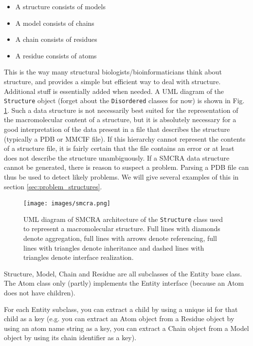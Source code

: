 \begin{itemize}
\item A structure consists of models
\item A model consists of chains
\item A chain consists of residues
\item A residue consists of atoms
\end{itemize}
This is the way many structural biologists/bioinformaticians think
about structure, and provides a simple but efficient way to deal with
structure. Additional stuff is essentially added when needed. A UML
diagram of the \texttt{Structure} object (forget about the \texttt{Disordered}
classes for now) is shown in Fig. \ref{fig:smcra}. Such a data structure is not
necessarily best suited for the representation of the macromolecular content of
a structure, but it is absolutely necessary for a good interpretation of the
data present in a file that describes the structure (typically a PDB or MMCIF
file). If this hierarchy cannot represent the contents of a structure file, it
is fairly certain that the file contains an error or at least does not describe
the structure unambiguously. If a SMCRA data structure cannot be generated,
there is reason to suspect a problem. Parsing a PDB file can thus be used to
detect likely problems. We will give several examples of this in section
\ref{sec:problem_structures}.

\begin{figure}[htbp]
\begin{htmlonly}
\end{htmlonly}
\begin{latexonly}
\centering
\texttt{[image: images/smcra.png]}
\end{latexonly}
\caption{UML diagram of SMCRA architecture of the \texttt{Structure} class used to represent a macromolecular structure.
Full lines with diamonds denote aggregation, full lines with
arrows denote referencing, full lines with triangles denote inheritance
and dashed lines with triangles denote interface realization.}
\label{fig:smcra}
\end{figure}

Structure, Model, Chain and Residue are all subclasses of the Entity base class.
The Atom class only (partly) implements the Entity interface (because an Atom
does not have children).

For each Entity subclass, you can extract a child by using a unique id for that
child as a key (e.g. you can extract an Atom object from a Residue object by
using an atom name string as a key, you can extract a Chain object from a Model
object by using its chain identifier as a key).


